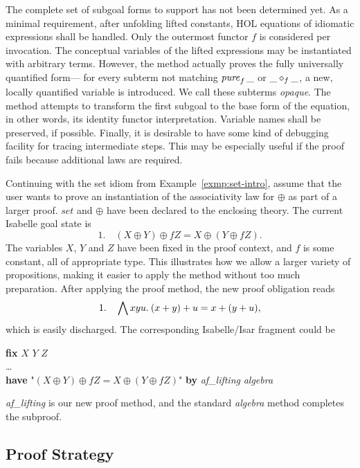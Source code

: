 The complete set of subgoal forms to support has not been determined yet.
\todo{}
As a minimal requirement, after unfolding lifted constants, HOL equations of
idiomatic expressions shall be handled.
Only the outermost functor $f$ is considered per invocation.
The conceptual variables of the lifted expressions may be instantiated with
arbitrary terms.
However, the method actually proves the fully universally quantified form---%
for every subterm not matching $\operatorname{\mathit{pure}}_f{\_}$ or $\_ \diamond_f \_$, a new, locally
quantified variable is introduced.
We call these subterms \emph{opaque}.
The method attempts to transform the first subgoal to the base form of the
equation, in other words, its identity functor interpretation.
Variable names shall be preserved, if possible.
Finally, it is desirable to have some kind of debugging facility for tracing
intermediate steps.
This may be especially useful if the proof fails because additional laws are
required.

\begin{example}\label{exmp:set-usage}
Continuing with the set idiom from Example~\ref{exmp:set-intro}, assume that
the user wants to prove an instantiation of the associativity law for $\oplus$
as part of a larger proof.
$\mathit{set}$ and $\oplus$ have been declared to the enclosing theory.
The current Isabelle goal state is
\[ 1. \quad (X \oplus Y) \oplus f Z = X \oplus (Y \oplus f Z). \]
The variables $X$, $Y$ and $Z$ have been fixed in the proof context, and $f$ is
some constant, all of appropriate type.
This illustrates how we allow a larger variety of propositions, making it
easier to apply the method without too much preparation.
After applying the proof method, the new proof obligation reads
\[ 1. \quad \bigwedge x y u.\>(x + y) + u = x + (y + u), \]
which is easily discharged.
The corresponding Isabelle/Isar fragment could be
\begin{isabelle}
	\textbf{fix} $X$ $Y$ $Z$ \\
	\dots \\
	\textbf{have} "$(X \oplus Y) \oplus f Z = X \oplus (Y \oplus f Z)$"
		\textbf{by} \textit{af\_lifting} \textit{algebra}
\end{isabelle}
\textit{af\_lifting} is our new proof method, and the standard \textit{algebra}
method completes the subproof.
\end{example}

\subsection{Proof Strategy}\label{subsec:proof-strategy}

